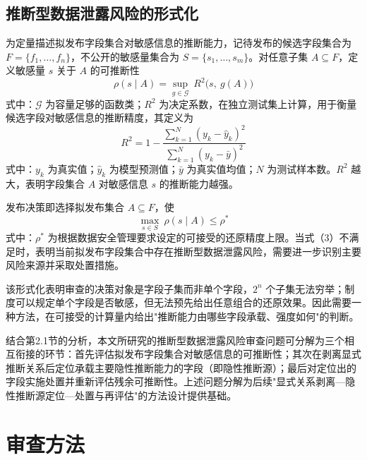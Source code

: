 \documentclass[UTF8,zihao=5,twoside,fontset=none]{ctexart}
\newcommand{\rev}[1]{{\color{blue}#1}}
\begin{document}
\subsection{\rev{推断型数据泄露风险的形式化}}

\rev{为定量描述拟发布字段集合对敏感信息的推断能力，}记待发布的候选字段集合为 $F=\{f_1,\dots,f_n\}$，不公开的敏感量集合为 $S=\{s_1,\dots,s_m\}$。对任意子集 $A\subseteq F$，定义敏感量 $s$ 关于 $A$ 的可推断性
\begin{equation}
\rho(s\mid A)=\sup_{g\in\mathcal{G}}\ R^2\big(s,\ g(A)\big)
\end{equation}
式中：$\mathcal{G}$ 为容量足够的函数类；$R^2$ 为决定系数，在独立测试集上计算，\rev{用于衡量候选字段对敏感信息的推断精度，}其定义为
\begin{equation}
R^2=1-\frac{\sum_{k=1}^{N}(y_k-\hat y_k)^2}{\sum_{k=1}^{N}(y_k-\bar y)^2}
\end{equation}
式中：$y_k$ 为真实值；$\hat y_k$ 为模型预测值；$\bar y$ 为真实值均值；$N$ 为测试样本数。\rev{$R^2$ 越大，表明字段集合 $A$ 对敏感信息 $s$ 的推断能力越强。}

发布决策即选择拟发布集合 $A\subseteq F$，使
\begin{equation}
\max_{s\in S}\ \rho(s\mid A)\le \rho^{\ast}
\end{equation}
式中：$\rho^{\ast}$ 为\rev{根据数据安全管理要求设定的}可接受的还原精度上限。\rev{当式（3）不满足时，表明当前拟发布字段集合中存在推断型数据泄露风险，需要进一步识别主要风险来源并采取处置措施。}

该形式化表明审查的决策对象是字段子集而非单个字段，$2^n$ 个子集无法穷举；制度可以规定单个字段是否敏感，但无法预先给出任意组合的还原效果。因此需要一种方法，在可接受的计算量内给出"推断能力由哪些字段承载、强度如何"的判断。

{\color{blue}结合第2.1节的分析，本文所研究的推断型数据泄露风险审查问题可分解为三个相互衔接的环节：首先评估拟发布字段集合对敏感信息的可推断性；其次在剥离显式推断关系后定位承载主要隐性推断能力的字段（即隐性推断源）；最后对定位出的字段实施处置并重新评估残余可推断性。上述问题分解为后续"显式关系剥离—隐性推断源定位—处置与再评估"的方法设计提供基础。}

\section{\rev{审查方法}}
\end{document}
